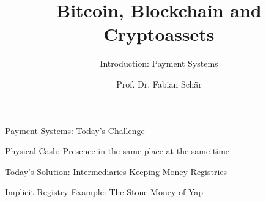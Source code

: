 \documentclass[handout]{beamer}
\title{Bitcoin, Blockchain and Cryptoassets}
\subtitle{Introduction: Payment Systems}
\author{Prof. Dr. Fabian Schär}
\institute{University of Basel}
\begin{document}
\thispagestyle{empty}
\begin{frame}[noframenumbering]
	\titlepage
\end{frame}

\begin{frame}{Payment Systems: Today's Challenge}

Physical Cash: Presence in the same place at the same time
\begin{figure}[h]
	\center
		
\end{figure}

\vspace{1.5 em}

	
\end{frame}

\begin{frame}{Today's Solution: Intermediaries Keeping Money Registries}

\begin{figure}[h]
	\center
		
\end{figure}

	
\end{frame}

\begin{frame}{Implicit Registry Example: The Stone Money of Yap}

\begin{figure}[h]
	\center
		
\end{figure}
	
\end{frame}
\end{document}

